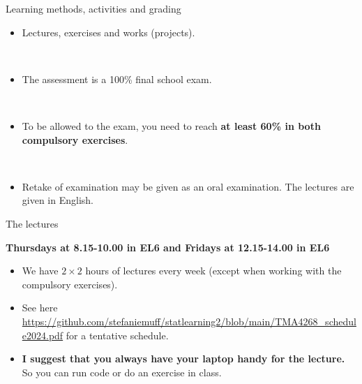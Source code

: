 \documentclass[
  10pt,
  ignorenonframetext,
]{beamer}
\providecommand{\tightlist}{%
  \setlength{\itemsep}{0pt}\setlength{\parskip}{0pt}}
\begin{document}
\begin{frame}
\begin{block}{Learning methods, activities and grading}
\protect\hypertarget{learning-methods-activities-and-grading}{}
\(~\)

\begin{itemize}
\tightlist
\item
  Lectures, exercises and works (projects).
\end{itemize}

\(~\)

\begin{itemize}
\tightlist
\item
  The assessment is a 100\% final school exam.
\end{itemize}

\(~\)

\begin{itemize}
\tightlist
\item
  To be allowed to the exam, you need to reach \textbf{at least 60\% in
  both compulsory exercises}.
\end{itemize}

\(~\)

\begin{itemize}
\tightlist
\item
  Retake of examination may be given as an oral examination. The
  lectures are given in English.
\end{itemize}
\end{block}
\end{frame}

\begin{frame}
\begin{block}{The lectures}
\protect\hypertarget{the-lectures}{}
\vspace{4mm}

\textbf{Thursdays at 8.15-10.00 in EL6 and Fridays at 12.15-14.00 in
EL6}

\vspace{4mm}

\begin{itemize}
\tightlist
\item
  We have \(2\times 2\) hours of lectures every week (except when
  working with the compulsory exercises).
\end{itemize}

\vspace{2mm}

\begin{itemize}
\tightlist
\item
  See here
  \url{https://github.com/stefaniemuff/statlearning2/blob/main/TMA4268_schedule2024.pdf}
  for a tentative schedule.
\end{itemize}

\vspace{2mm}

\begin{itemize}
\tightlist
\item
  \textbf{I suggest that you always have your laptop handy for the
  lecture.} So you can run code or do an exercise in class.
\end{itemize}
\end{block}
\end{frame}
\end{document}
